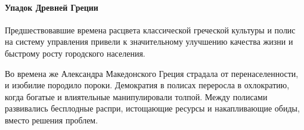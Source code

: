 
\paragraph{Упадок Древней Греции}
Предшествовавшие времена расцвета классической греческой культуры и полис на систему управления привели к значительному улучшению качества жизни и быстрому росту городского населения. 

Во времена же Александра Македонского Греция страдала от перенаселенности, и изобилие породило пороки. Демократия в полисах переросла в охлократию, когда богатые и влиятельные манипулировали толпой. Между полисами развивались бесплодные распри, истощающие ресурсы и накапливающие обиды, вместо решения проблем.



